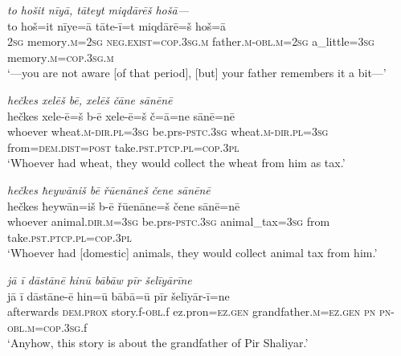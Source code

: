 \ea \label{BP.13}
\textit{to hošit nīyā, tāteyt miqdārēš hošā—} \\ 
\gll to hoš=it nīye=ā tāte-ī=t miqdārē=š hoš=ā \\ 
 \textsc{2sg} memory\textsc{.m}\textsc{=\textsc{2sg}} \textsc{\textsc{neg.}exist}\textsc{=cop}\textsc{.3sg}\textsc{.m} father\textsc{.m}\textsc{-obl}\textsc{.m}\textsc{=\textsc{2sg}} a\_little\textsc{=3sg} memory\textsc{.m}\textsc{=cop}\textsc{.3sg}\textsc{.m} \\ 
\glt `—you are not aware [of that period], [but] your father remembers it a bit—'
\z 
 
\ea \label{BP.15}
\textit{hečkes xelēš bē, xelēš čāne sānēnē} \\ 
\gll hečkes xele-ē=š b-ē xele-ē=š č=ā=ne sānē=nē \\ 
 whoever wheat\textsc{.m}\textsc{-dir}\textsc{.pl}\textsc{=3sg} be.prs\textsc{-pstc}\textsc{.3sg} wheat\textsc{.m}\textsc{-dir}\textsc{.pl}\textsc{=3sg} from=\textsc{dem.dist}\textsc{=\textsc{post}} take\textsc{.pst}\textsc{.ptcp}\textsc{.pl}\textsc{=cop}\textsc{.3pl} \\ 
\glt `Whoever had wheat, they would collect the wheat from him as tax.'
\z 
 
\ea \label{BP.16}
\textit{hečkes ħeywāniš bē řūenāneš čene sānēnē} \\ 
\gll hečkes ħeywān=iš b-ē řūenāne=š čene sānē=nē \\ 
 whoever animal\textsc{.dir}\textsc{.m}\textsc{=3sg} be.prs\textsc{-pstc}\textsc{.3sg} animal\_tax\textsc{=3sg} from take\textsc{.pst}\textsc{.ptcp}\textsc{.pl}\textsc{=cop}\textsc{.3pl} \\ 
\glt `Whoever had [domestic] animals, they would collect animal tax from him.'
\z 
 
\ea \label{BP.20}
\textit{jā ī dāstānē hinū bābāw pīr šelīyārīne} \\ 
\gll jā ī dāstāne-ē hin=ū bābā=ū pīr šelīyār-ī=ne \\ 
 afterwards \textsc{dem.prox} story.f\textsc{-obl}.f ez.pron\textsc{=ez.gen} grandfather\textsc{.m}\textsc{=ez.gen} \textsc{pn} \textsc{pn}\textsc{-obl}\textsc{.m}\textsc{=cop}\textsc{.3sg}.f \\ 
\glt `Anyhow, this story is about the grandfather of Pir Shaliyar.'
\z 
 
